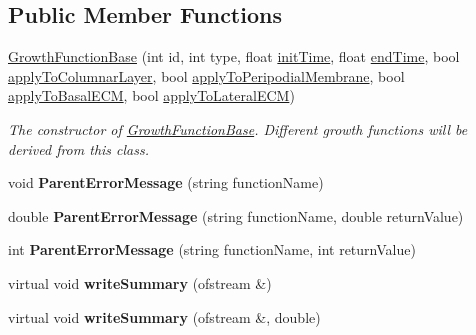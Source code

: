 \subsection*{Public Member Functions}
\begin{DoxyCompactItemize}
\item 
\hyperlink{classGrowthFunctionBase_a5c275b3f839cc4f572b68afc5ad1064f}{Growth\+Function\+Base} (int id, int type, float \hyperlink{classGrowthFunctionBase_ae92513a7b41637df8e26e7db35ddf97c}{init\+Time}, float \hyperlink{classGrowthFunctionBase_a3ff4db0573d354a75666a5f3ca446941}{end\+Time}, bool \hyperlink{classGrowthFunctionBase_a3d56771e7c145589a14e11cc331e0326}{apply\+To\+Columnar\+Layer}, bool \hyperlink{classGrowthFunctionBase_a08ae19f58cb98fa8e315a77f52749732}{apply\+To\+Peripodial\+Membrane}, bool \hyperlink{classGrowthFunctionBase_a9fe46fc6dde4041b79204beb48972a09}{apply\+To\+Basal\+E\+C\+M}, bool \hyperlink{classGrowthFunctionBase_ac623b1dbe376bce5dddbe1a2e21c776f}{apply\+To\+Lateral\+E\+C\+M})
\begin{DoxyCompactList}\small\item\em The constructor of \hyperlink{classGrowthFunctionBase}{Growth\+Function\+Base}. Different growth functions will be derived from this class. \end{DoxyCompactList}\item 
\hypertarget{classGrowthFunctionBase_ad5b4e88d33c4b72444c5c25c25ab68fb}{}void {\bfseries Parent\+Error\+Message} (string function\+Name)\label{classGrowthFunctionBase_ad5b4e88d33c4b72444c5c25c25ab68fb}

\item 
\hypertarget{classGrowthFunctionBase_aed234af9feb797628d4a2d598dcf9632}{}double {\bfseries Parent\+Error\+Message} (string function\+Name, double return\+Value)\label{classGrowthFunctionBase_aed234af9feb797628d4a2d598dcf9632}

\item 
\hypertarget{classGrowthFunctionBase_a9097ca54f854aa0d1c8d220c971580dd}{}int {\bfseries Parent\+Error\+Message} (string function\+Name, int return\+Value)\label{classGrowthFunctionBase_a9097ca54f854aa0d1c8d220c971580dd}

\item 
\hypertarget{classGrowthFunctionBase_a2b96fbe78194d7dec43212057bbee66d}{}virtual void {\bfseries write\+Summary} (ofstream \&)\label{classGrowthFunctionBase_a2b96fbe78194d7dec43212057bbee66d}

\item 
\hypertarget{classGrowthFunctionBase_a73b474a60caeb5b6b326ecb6a056cfe4}{}virtual void {\bfseries write\+Summary} (ofstream \&, double)\label{classGrowthFunctionBase_a73b474a60caeb5b6b326ecb6a056cfe4}


\end{DoxyCompactItemize}
